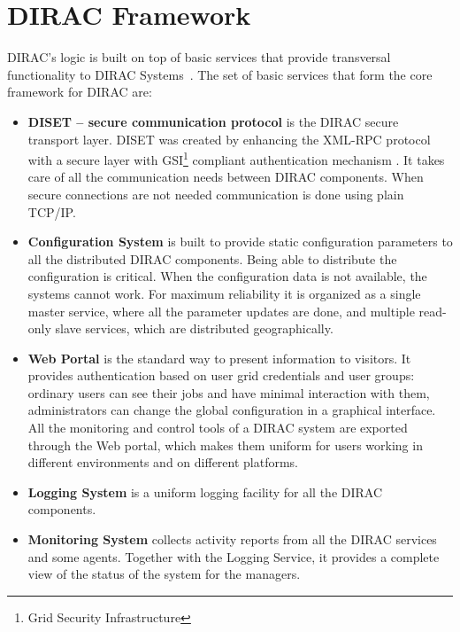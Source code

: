 \section{DIRAC Framework}

DIRAC’s logic is built on top of basic services that provide transversal
functionality to DIRAC Systems~\cite{DISET}. The set of basic services that form the core framework for
DIRAC are: 
\begin{itemize}

\item \textbf{DISET -- secure communication protocol}
	is the DIRAC secure transport layer. DISET was created by enhancing the XML-RPC
	protocol with a secure layer with GSI\footnote{Grid Security Infrastructure} compliant authentication mechanism 
	\cite{DISET2}. 	It takes care of all the communication needs between DIRAC components. 
	When secure connections are not needed communication is done using plain TCP/IP.
	
\item \textbf{Configuration System}
	is built to provide static configuration parameters to all the distributed DIRAC components. Being able to
	distribute the configuration is critical. When the configuration data is not available, 
	the systems cannot work. For maximum reliability it is organized as a single master service, where 
	all the parameter updates are done, and multiple read-only slave services, which are distributed geographically.

\item \textbf{Web Portal}
	is the standard way to present information to visitors. It provides authentication based on user grid
	credentials and user groups: ordinary users can see their jobs and have minimal interaction with
	them, administrators can change the global configuration in a graphical interface.
	All the monitoring and control tools of a DIRAC system are exported through the Web portal, 
	which makes them uniform for users working in different environments and on different platforms.
	
\item \textbf{Logging System}
	is a uniform logging facility for all the DIRAC components.

\item \textbf{Monitoring System}
	collects activity reports from all the DIRAC services and some agents. Together
	with the Logging Service, it provides a complete view of the status of the system for the managers.
\end{itemize}

